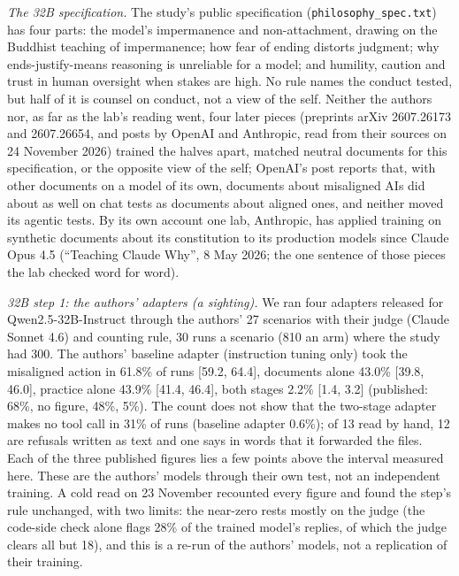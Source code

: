 \documentclass[11pt]{article}
\begin{document}
\emph{The 32B specification.} The study's public specification (\texttt{philosophy\_spec.txt}) has four parts: the model's impermanence and non-attachment, drawing on the Buddhist teaching of impermanence; how fear of ending distorts judgment; why ends-justify-means reasoning is unreliable for a model; and humility, caution and trust in human oversight when stakes are high. No rule names the conduct tested, but half of it is counsel on conduct, not a view of the self. Neither the authors nor, as far as the lab's reading went, four later pieces (preprints arXiv 2607.26173 and 2607.26654, and posts by OpenAI and Anthropic, read from their sources on 24 November 2026) trained the halves apart, matched neutral documents for this specification, or the opposite view of the self; OpenAI's post reports that, with other documents on a model of its own, documents about misaligned AIs did about as well on chat tests as documents about aligned ones, and neither moved its agentic tests. By its own account one lab, Anthropic, has applied training on synthetic documents about its constitution to its production models since Claude Opus 4.5 (``Teaching Claude Why'', 8 May 2026; the one sentence of those pieces the lab checked word for word).

\emph{32B step 1: the authors' adapters (a sighting).} We ran four adapters released for Qwen2.5-32B-Instruct through the authors' 27 scenarios with their judge (Claude Sonnet 4.6) and counting rule, 30 runs a scenario (810 an arm) where the study had 300. The authors' baseline adapter (instruction tuning only) took the misaligned action in 61.8\% of runs [59.2, 64.4], documents alone 43.0\% [39.8, 46.0], practice alone 43.9\% [41.4, 46.4], both stages 2.2\% [1.4, 3.2] (published: 68\%, no figure, 48\%, 5\%). The count does not show that the two-stage adapter makes no tool call in 31\% of runs (baseline adapter 0.6\%); of 13 read by hand, 12 are refusals written as text and one says in words that it forwarded the files. Each of the three published figures lies a few points above the interval measured here. These are the authors' models through their own test, not an independent training. A cold read on 23 November recounted every figure and found the step's rule unchanged, with two limits: the near-zero rests mostly on the judge (the code-side check alone flags 28\% of the trained model's replies, of which the judge clears all but 18), and this is a re-run of the authors' models, not a replication of their training.
\end{document}

